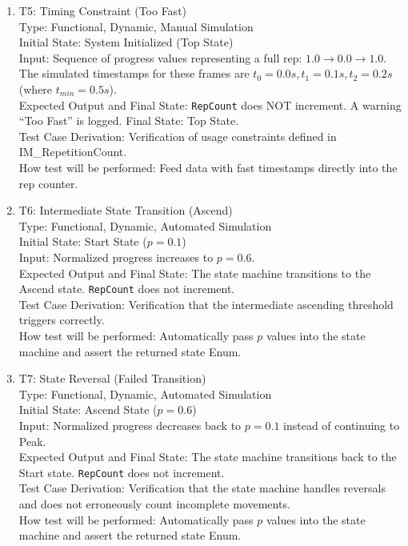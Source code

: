 \documentclass[12pt, titlepage]{article}
\begin{document}
\begin{enumerate}
\item{T5: Timing Constraint (Too Fast)\\}
Type: Functional, Dynamic, Manual Simulation\\
Initial State: System Initialized (Top State)\\
Input: Sequence of progress values representing a full rep: $1.0 \rightarrow 0.0 \rightarrow 1.0$. The simulated timestamps for these frames are $t_0 = 0.0s, t_1 = 0.1s, t_2 = 0.2s$ (where $t_{min} = 0.5s$).\\
Expected Output and Final State: \texttt{RepCount} does NOT increment. A warning ``Too Fast'' is logged. Final State: Top State.\\
Test Case Derivation: Verification of usage constraints defined in IM\_RepetitionCount.\\
How test will be performed: Feed data with fast timestamps directly into the rep counter.

\item{T6: Intermediate State Transition (Ascend)\\}
Type: Functional, Dynamic, Automated Simulation\\
Initial State: Start State ($p = 0.1$)\\
Input: Normalized progress increases to $p = 0.6$.\\
Expected Output and Final State: The state machine transitions to the Ascend state. \texttt{RepCount} does not increment.\\
Test Case Derivation: Verification that the intermediate ascending threshold triggers correctly.\\
How test will be performed: Automatically pass $p$ values into the state machine and assert the returned state Enum.

\item{T7: State Reversal (Failed Transition)\\}
Type: Functional, Dynamic, Automated Simulation\\
Initial State: Ascend State ($p = 0.6$)\\
Input: Normalized progress decreases back to $p = 0.1$ instead of continuing to Peak.\\
Expected Output and Final State: The state machine transitions back to the Start state. \texttt{RepCount} does not increment.\\
Test Case Derivation: Verification that the state machine handles reversals and does not erroneously count incomplete movements.\\
How test will be performed: Automatically pass $p$ values into the state machine and assert the returned state Enum.
\end{enumerate}
\end{document}
